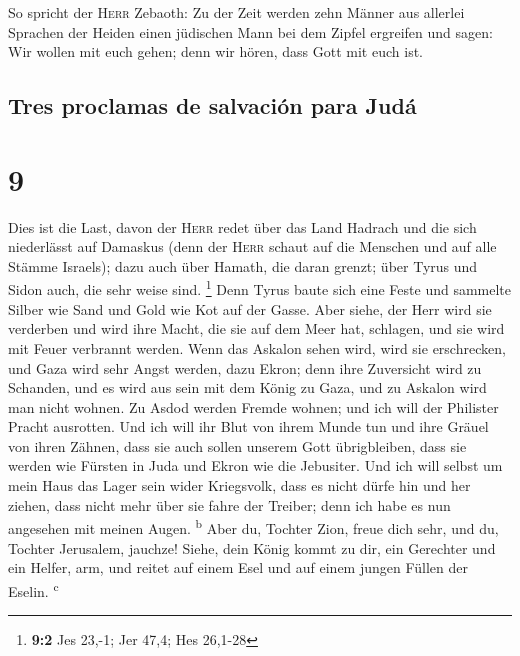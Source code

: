  So spricht der \textsc{Herr} Zebaoth: Zu der Zeit werden
zehn Männer aus allerlei Sprachen der Heiden einen jüdischen Mann bei
dem Zipfel ergreifen und sagen: Wir wollen mit euch gehen; denn wir
hören, dass Gott mit euch ist.

\hypertarget{tres-proclamas-de-salvaciuxf3n-para-juduxe1}{%
\subsection{Tres proclamas de salvación para
Judá}\label{tres-proclamas-de-salvaciuxf3n-para-juduxe1}}

\hypertarget{section-8}{%
\section{9}\label{section-8}}

 Dies ist die Last, davon der \textsc{Herr} redet über das
Land Hadrach und die sich niederlässt auf Damaskus (denn der
\textsc{Herr} schaut auf die Menschen und auf alle Stämme Israels);
 dazu auch über Hamath, die daran grenzt; über Tyrus und
Sidon auch, die sehr weise sind. \footnote{\textbf{9:2} Jes 23,-1; Jer
  47,4; Hes 26,1-28}  Denn Tyrus baute sich eine Feste und
sammelte Silber wie Sand und Gold wie Kot auf der Gasse. 
Aber siehe, der Herr wird sie verderben und wird ihre Macht, die sie auf
dem Meer hat, schlagen, und sie wird mit Feuer verbrannt werden.
 Wenn das Askalon sehen wird, wird sie erschrecken, und
Gaza wird sehr Angst werden, dazu Ekron; denn ihre Zuversicht wird zu
Schanden, und es wird aus sein mit dem König zu Gaza, und zu Askalon
wird man nicht wohnen.  Zu Asdod werden Fremde wohnen; und
ich will der Philister Pracht ausrotten.  Und ich will ihr
Blut von ihrem Munde tun und ihre Gräuel von ihren Zähnen, dass sie auch
sollen unserem Gott übrigbleiben, dass sie werden wie Fürsten in Juda
und Ekron wie die Jebusiter.  Und ich will selbst um mein
Haus das Lager sein wider Kriegsvolk, dass es nicht dürfe hin und her
ziehen, dass nicht mehr über sie fahre der Treiber; denn ich habe es nun
angesehen mit meinen Augen. \textsuperscript{b}  Aber du,
Tochter Zion, freue dich sehr, und du, Tochter Jerusalem, jauchze!
Siehe, dein König kommt zu dir, ein Gerechter und ein Helfer, arm, und
reitet auf einem Esel und auf einem jungen Füllen der Eselin.
\textsuperscript{c}

